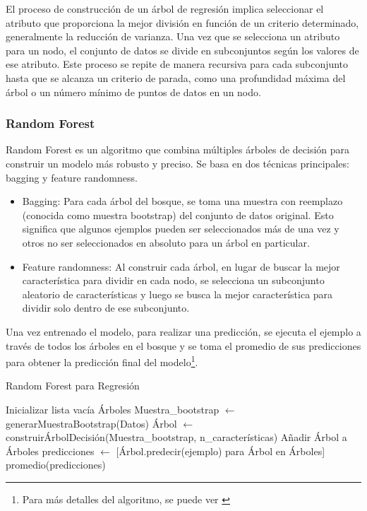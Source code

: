 \documentclass[12pt]{article}
\begin{document}
El proceso de construcción de un árbol de regresión implica seleccionar el atributo que proporciona la mejor división en función de un criterio determinado, generalmente la reducción de varianza. Una vez que se selecciona un atributo para un nodo, el conjunto de datos se divide en subconjuntos según los valores de ese atributo. Este proceso se repite de manera recursiva para cada subconjunto hasta que se alcanza un criterio de parada, como una profundidad máxima del árbol o un número mínimo de puntos de datos en un nodo.

\subsubsection{Random Forest}

Random Forest es un algoritmo que combina múltiples árboles de decisión para construir un modelo más robusto y preciso. Se basa en dos técnicas principales: bagging y feature randomness.

\begin{itemize}
  \item Bagging: Para cada árbol del bosque, se toma una muestra con reemplazo (conocida como muestra bootstrap) del conjunto de datos original. Esto significa que algunos ejemplos pueden ser seleccionados más de una vez y otros no ser seleccionados en absoluto para un árbol en particular.
  \item Feature randomness: Al construir cada árbol, en lugar de buscar la mejor característica para dividir en cada nodo, se selecciona un subconjunto aleatorio de características y luego se busca la mejor característica para dividir solo dentro de ese subconjunto.
\end{itemize}

Una vez entrenado el modelo, para realizar una predicción, se ejecuta el ejemplo a través de todos los árboles en el bosque y se toma el promedio de sus predicciones para obtener la predicción final del modelo\footnote{Para más detalles del algoritmo, se puede ver \cite{rf}}.

\begin{algorithm}
\caption{Random Forest para Regresión}
\begin{algorithmic}
    \State Inicializar lista vacía Árboles
        \State Muestra\_bootstrap $\leftarrow$ generarMuestraBootstrap(Datos)
        \State Árbol $\leftarrow$ construirÁrbolDecisión(Muestra\_bootstrap, n\_características)
        \State Añadir Árbol a Árboles
    \EndFor
        \State predicciones $\leftarrow$ [Árbol.predecir(ejemplo) para Árbol en Árboles]
        \State \Return promedio(predicciones)
    \EndProcedure
\EndProcedure
\end{algorithmic}
\end{algorithm}
\end{document}
